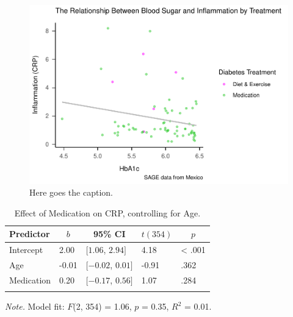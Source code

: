 \documentclass[
  man]{apa6}
\begin{document}
\begin{figure}
\centering
\includegraphics{NEW_Final_Groupof5_files/figure-latex/tian-filtering-1.pdf}
\caption{\label{fig:tian-filtering}Here goes the caption.}
\end{figure}



\begin{table}[tbp]

\begin{center}
\begin{threeparttable}

\caption{\label{tab:regtab1}Effect of Medication on CRP, controlling for Age. }

\begin{tabular}{lllll}
\toprule
Predictor & \multicolumn{1}{c}{$b$} & \multicolumn{1}{c}{95\% CI} & \multicolumn{1}{c}{$t(354)$} & \multicolumn{1}{c}{$p$}\\
\midrule
Intercept & 2.00 & $[1.06$, $2.94]$ & 4.18 & < .001\\
Age & -0.01 & $[-0.02$, $0.01]$ & -0.91 & .362\\
Medication & 0.20 & $[-0.17$, $0.56]$ & 1.07 & .284\\
\bottomrule
\addlinespace
\end{tabular}

\begin{tablenotes}[para]
\normalsize{\textit{Note.} Model fit: $F$(2, 354) = 1.06, $p$ = 0.35, $R^2$ = 0.01.}
\end{tablenotes}

\end{threeparttable}
\end{center}

\end{table}
\end{document}
